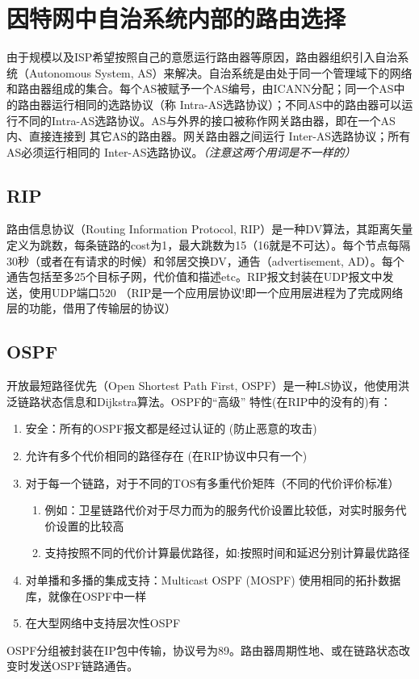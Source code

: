 \documentclass[]{report}
\begin{document}
	\section{因特网中自治系统内部的路由选择}
	由于规模以及ISP希望按照自己的意愿运行路由器等原因，路由器组织引入自治系统（Autonomous System, AS）来解决。自治系统是由处于同一个管理域下的网络和路由器组成的集合。每个AS被赋予一个AS编号，由ICANN分配；同一个AS中的路由器运行相同的选路协议（称
	Intra-AS选路协议）；不同AS中的路由器可以运行不同的Intra-AS选路协议。AS与外界的接口被称作网关路由器，即在一个AS内、直接连接到 其它AS的路由器。网关路由器之间运行 Inter-AS选路协议；所有AS必须运行相同的 Inter-AS选路协议。\textit{（注意这两个用词是不一样的）}
		\subsection{RIP}
		路由信息协议（Routing Information Protocol, RIP）是一种DV算法，其距离矢量定义为跳数，每条链路的cost为1，最大跳数为15（16就是不可达）。每个节点每隔30秒（或者在有请求的时候）和邻居交换DV，通告（advertisement, AD）。每个通告包括至多25个目标子网，代价值和描述etc。RIP报文封装在UDP报文中发送，使用UDP端口520 （{\color[HTML]{FF0000}RIP是一个应用层协议!}即一个应用层进程为了完成网络层的功能，借用了传输层的协议）
		\subsection{OSPF}
		开放最短路径优先（Open Shortest Path First, OSPF）是一种LS协议，他使用洪泛链路状态信息和Dijkstra算法。OSPF的“高级” 特性(在RIP中的没有的)有：
		\begin{enumerate}
			\item 安全：所有的OSPF报文都是经过认证的 (防止恶意的攻击)
			\item 允许有多个代价相同的路径存在 (在RIP协议中只有一个)
			\item 对于每一个链路，对于不同的TOS有多重代价矩阵（不同的代价评价标准）
			\begin{enumerate}
				\item 例如：卫星链路代价对于尽力而为的服务代价设置比较低，对实时服务代价设置的比较高
				\item 支持按照不同的代价计算最优路径，如:按照时间和延迟分别计算最优路径
			\end{enumerate}
			\item 对单播和多播的集成支持：Multicast OSPF (MOSPF) 使用相同的拓扑数据库，就像在OSPF中一样
			\item 在大型网络中支持层次性OSPF
		\end{enumerate}\par
		OSPF分组被封装在IP包中传输，协议号为89。路由器周期性地、或在链路状态改变时发送OSPF链路通告。
\end{document}
